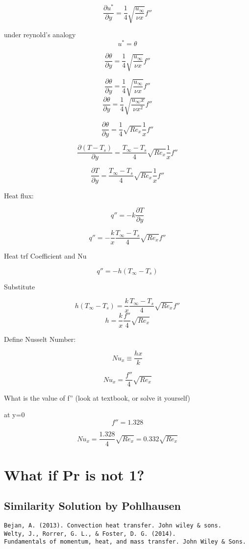 \documentclass[11pt]{article}
\begin{document}
$$\frac{\partial u^*}{\partial y} = \frac{1}{4} \sqrt{\frac{u_\infty}{\nu x}} f''$$

under reynold's analogy
$$u^* = \theta $$

$$\frac{\partial \theta}{\partial y} = \frac{1}{4} \sqrt{\frac{u_\infty}{\nu x}} f''$$

$$\frac{\partial \theta}{\partial y} = \frac{1}{4} \sqrt{\frac{u_\infty}{\nu x}} f''$$
$$\frac{\partial \theta}{\partial y} = \frac{1}{4} \sqrt{\frac{u_\infty x}{\nu x^2}} f''$$

$$\frac{\partial \theta}{\partial y} = \frac{1}{4} \sqrt{Re_x} \frac{1}{x} f''$$

$$\frac{\partial (T-T_s)}{\partial y} = \frac{T_\infty - T_s}{4} \sqrt{Re_x} \frac{1}{x} f''$$

$$\frac{\partial T}{\partial y} = \frac{T_\infty - T_s}{4} \sqrt{Re_x} \frac{1}{x} f''$$

Heat flux:

$$q'' = - k \frac{\partial T}{\partial y}$$

$$q'' = - \frac{k}{x} \frac{T_\infty - T_s}{4} \sqrt{Re_x} f''$$

Heat trf Coefficient and Nu

$$q''= - h (T_\infty - T_s)$$

Substitute

$$h (T_\infty - T_s) =  \frac{k}{x} \frac{T_\infty - T_s}{4} \sqrt{Re_x} f''$$
$$h  =  \frac{k}{x} \frac{f''}{4} \sqrt{Re_x}$$

Define Nusselt Number:

$$Nu_x \equiv \frac{hx}{k}$$

$$Nu_x = \frac{f''}{4} \sqrt{Re_x}$$

What is the value of f'' (look at textbook, or solve it yourself)

at y=0
$$f'' = 1.328$$

$$Nu_x = \frac{1.328}{4} \sqrt{Re_x} = 0.332 \sqrt{Re_x} $$

\section{What if Pr is not 1?}

\subsection{Similarity Solution by Pohlhausen}
\begin{verbatim}
Bejan, A. (2013). Convection heat transfer. John wiley & sons.
Welty, J., Rorrer, G. L., & Foster, D. G. (2014). 
Fundamentals of momentum, heat, and mass transfer. John Wiley & Sons.
\end{verbatim}
\end{document}
